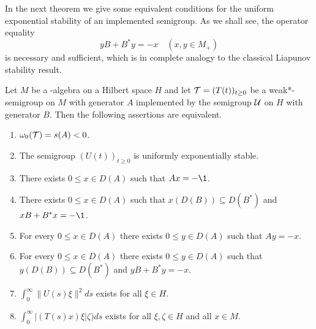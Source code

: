 In the next theorem we give some equivalent conditions for the uniform exponential stability of an implemented semigroup.
As we shall see, the operator equality
\[
yB + B^{*}y = -x \quad (x, y \in M_{+})
\]
is necessary and sufficient, which is in complete analogy to the classical Liapunov stability result.
\begin{theorem}\label{thm:d4-2.2}
Let $M$ be a \WA-algebra on a Hilbert space $H$ and let $\mathcal{T} = (T(t))_{t \geq 0}$ be a weak*-semigroup on $M$ with generator $A$ implemented by the semigroup $\mathcal{U}$ on $H$ with generator $B$.
Then the following assertions are equivalent.
\begin{enumerate}[\upshape (a)]

\item\label{item:d4-2.2-a}
$\omega_{0}(\mathcal{T}) = s(A) < 0$.

\item\label{item:d4-2.2-b}
The semigroup $(U(t))_{t \geq 0}$ is uniformly exponentially stable.

\item\label{item:d4-2.2-c}
There exists $0 \leq x \in D(A)$ such that $Ax = -\1$.

\item\label{item:d4-2.2-d}
There exists $0 \leq x \in D(A)$ such that $x(D(B)) \subseteq D(B^{*})$ \mbox{and $xB+B^{*}x = -\1$}.

\item\label{item:d4-2.2-e}
For every $0 \leq x \in D(A)$ there exists $0 \leq y \in D(A)$ such that $Ay = -x$.

\item\label{item:d4-2.2-f}
For every $0 \leq x \in D(A)$ there exists $0 \leq y \in D(A)$ such that $y(D(B)) \subseteq D(B^{*})$ and $yB+B^{*}y = -x$.

\item\label{item:d4-2.2-g}
$\int_{0}^{\infty} \|U(s)\xi\|^2ds$ exists for all $\xi \in H$.

\item\label{item:d4-2.2-h}
$\int_{0}^{\infty} |(T(s)x)\xi|\zeta)ds$ exists for all $\xi,\zeta \in H$ and all $x \in M$.
\end{enumerate}
\end{theorem}

